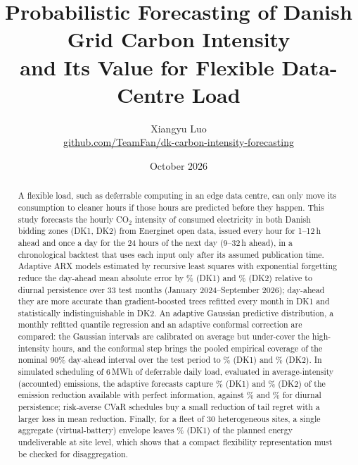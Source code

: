\documentclass[11pt,a4paper]{article}
\title{Probabilistic Forecasting of Danish Grid Carbon Intensity\\and Its Value for Flexible Data-Centre Load}
\author{Xiangyu Luo\\\small\href{https://github.com/TeamFan/dk-carbon-intensity-forecasting}{github.com/TeamFan/dk-carbon-intensity-forecasting}}
\date{October 2026}
\begin{document}
\maketitle

\begin{abstract}
\noindent
A flexible load, such as deferrable computing in an edge data centre, can only move its consumption to cleaner hours if those hours are predicted before they happen.
This study forecasts the hourly CO$_2$ intensity of consumed electricity in both Danish bidding zones (DK1, DK2) from Energinet open data, issued every hour for 1--12\,h ahead and once a day for the 24 hours of the next day (9--32\,h ahead), in a chronological backtest that uses each input only after its assumed publication time.
Adaptive ARX models estimated by recursive least squares with exponential forgetting reduce the day-ahead mean absolute error by \DKadaRed\% (DK1) and \DKbdaRed\% (DK2) relative to diurnal persistence over 33 test months (January 2024--September 2026); day-ahead they are more accurate than gradient-boosted trees refitted every month in DK1 and statistically indistinguishable in DK2.
An adaptive Gaussian predictive distribution, a monthly refitted quantile regression and an adaptive conformal correction are compared: the Gaussian intervals are calibrated on average but under-cover the high-intensity hours, and the conformal step brings the pooled empirical coverage of the nominal 90\% day-ahead interval over the test period to \DKacovNinetyAci\% (DK1) and \DKbcovNinetyAci\% (DK2).
In simulated scheduling of 6\,MWh of deferrable daily load, evaluated in average-intensity (accounted) emissions, the adaptive forecasts capture \DKabShareRls\% (DK1) and \DKbbShareRls\% (DK2) of the emission reduction available with perfect information, against \DKabShareDiur\% and \DKbbShareDiur\% for diurnal persistence; risk-averse CVaR schedules buy a small reduction of tail regret with a larger loss in mean reduction.
Finally, for a fleet of 30 heterogeneous sites, a single aggregate (virtual-battery) envelope leaves \DKacShortOne\% (DK1) of the planned energy undeliverable at site level, which shows that a compact flexibility representation must be checked for disaggregation.
\end{abstract}
\end{document}
